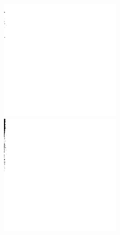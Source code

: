 \begin{figure}[H]
\endminipage\hfill
{}%
  \includegraphics[width=\linewidth]{imgs/x3.png}
\endminipage\hfill
{}%
  \includegraphics[width=\linewidth]{imgs/x4.png}

\end{figure}

